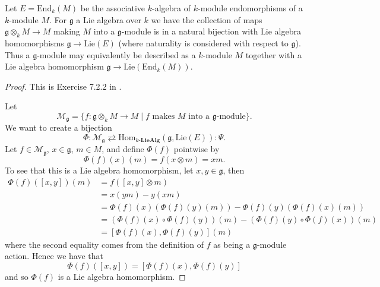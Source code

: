 \begin{lemma}
  \label{lem:ex7.2.2}
  Let $ E = \text{End}_k(M) $ be the associative $ k $-algebra of $ k $-module endomorphisms of a $ k $-module $ M $. For $ \mathfrak{g} $ a Lie algebra over $ k $ we have the collection of maps $ \mathfrak{g} \otimes_k M \to M $ making $ M $ into a $ \mathfrak{g} $-module is in a natural bijection with Lie algebra homomorphisms $ \mathfrak{g} \to \text{Lie}(E) $ (where naturality is considered with respect to $ \mathfrak{g} $). Thus a $ \mathfrak{g} $-module may equivalently be described as a $ k $-module $ M $ together with a Lie algebra homomorphism $ \mathfrak{g} \to \text{Lie}(\text{End}_k(M)) $.
\end{lemma}
\begin{proof}
  This is Exercise 7.2.2 in \cite{weibel1994homological}.

  Let
  \begin{equation}
    \mathcal{M}_\mathfrak{g} = \{f: \mathfrak{g} \otimes_k M \to M \mid f \text{ makes } M \text{ into a } \mathfrak{g}\text{-module}\}
  .\end{equation}
  We want to create a bijection
  \begin{equation*}
    \Phi: \mathcal{M}_{\mathfrak{g}} \rightleftarrows \text{Hom}_{k\text{-}\mathbf{LieAlg}}(\mathfrak{g}, \text{Lie}(E)): \Psi
  .\end{equation*}
  Let $ f \in \mathcal{M}_{\mathfrak{g}} $, $ x \in \mathfrak{g} $, $ m \in M $, and define $ \Phi(f) $ pointwise by
  \begin{equation}
    \Phi(f)(x)(m) = f(x \otimes m) = xm.
  \end{equation}
  To see that this is a Lie algebra homomorphism, let $ x, y \in \mathfrak{g} $, then
  \begin{align*}
    \Phi(f)([x,y])(m) &= f([x,y] \otimes m) \\
                      &= x(ym) - y(xm) \\
                      &= \Phi(f)(x)(\Phi(f)(y)(m)) - \Phi(f)(y)(\Phi(f)(x)(m)) \\
                      &= (\Phi(f)(x) \circ \Phi(f)(y))(m) - (\Phi(f)(y)\circ \Phi(f)(x))(m) \\
                      &= [\Phi(f)(x), \Phi(f)(y)](m)
  \end{align*}
  where the second equality comes from the definition of $ f $ as being a $ \mathfrak{g} $-module action. Hence we have that
  \begin{equation*}
    \Phi(f)([x,y]) = [\Phi(f)(x), \Phi(f)(y)]
  \end{equation*}
  and so $ \Phi(f) $ is a Lie algebra homomorphism.


\end{proof}
